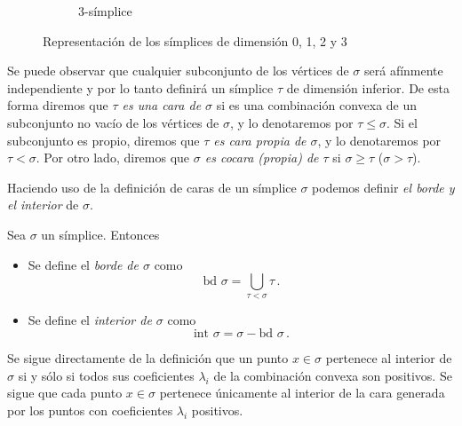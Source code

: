 \begin{figure}[h]
\begin{subfigure}[b]{0.2\textwidth}
	\caption{3-símplice}\label{ref:3simp}
\end{subfigure}
\caption{Representación de los símplices de dimensión 0, 1, 2 y 3}
\end{figure}

Se puede observar que cualquier subconjunto de los vértices de $\sigma$ será afínmente independiente y por lo tanto definirá un símplice $\tau$ de dimensión inferior. De esta forma diremos que \emph{$\tau$ es una cara de $\sigma$} si es una combinación convexa de un subconjunto no vacío de los vértices de $\sigma$, y lo denotaremos por $\tau \leq \sigma$. Si el subconjunto es propio, diremos que \emph{$\tau$ es cara propia de $\sigma$}, y lo denotaremos por $\tau < \sigma$. Por otro lado, diremos que \emph{$\sigma$ es cocara (propia) de $\tau$}  si $\sigma \geq \tau$ ($\sigma > \tau$).

Haciendo uso de la definición de caras de un símplice $\sigma$ podemos definir \emph{el borde y el interior} de $\sigma$.

\begin{definition}
Sea $\sigma$ un símplice. Entonces
\begin{itemize}
	\item Se define el \emph{borde de $\sigma$} como \[\text{bd } \sigma = \bigcup_{\tau<\sigma}\tau\,.\]
	\item Se define el \emph{interior de $\sigma$} como \[\text{int }\sigma= \sigma - \text{bd }\sigma\,.\]
\end{itemize}
\end{definition}

\begin{remark}
Se sigue directamente de la definición que un punto $x \in \sigma$ pertenece al interior de $\sigma$ si y sólo si todos sus coeficientes $\lambda_i$ de la combinación convexa son positivos. Se sigue que cada punto $x \in \sigma$ pertenece únicamente al interior de la cara generada por los puntos con coeficientes $\lambda_i$ positivos.
\end{remark}

